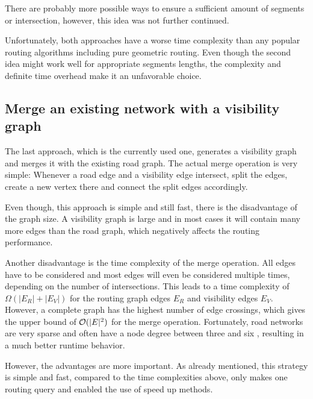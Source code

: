 		There are probably more possible ways to ensure a sufficient amount of segments or intersection, however, this idea was not further continued.
		
		Unfortunately, both approaches have a worse time complexity than any popular routing algorithms including pure geometric routing.
		Even though the second idea might work well for appropriate segments lengths, the complexity and definite time overhead make it an unfavorable choice.
	
	\subsection{Merge an existing network with a visibility graph}
	
		The last approach, which is the currently used one, generates a visibility graph and merges it with the existing road graph.
		The actual merge operation is very simple:
		Whenever a road edge and a visibility edge intersect, split the edges, create a new vertex there and connect the split edges accordingly.
		
		Even though, this approach is simple and still fast, there is the disadvantage of the graph size.
		A visibility graph is large and in most cases it will contain many more edges than the road graph, which negatively affects the routing performance.
		
		Another disadvantage is the time complexity of the merge operation.
		All edges have to be considered and most edges will even be considered multiple times, depending on the number of intersections.
		This leads to a time complexity of $\Omega(|E_R| + |E_V|)$ for the routing graph edges $E_R$ and visibility edges $E_V$.
		However, a complete graph has the highest number of edge crossings, which gives the upper bound of $\mathcal{O}(|E|^2)$ for the merge operation.
		Fortunately, road networks are very sparse and often have a node degree between three and six \cite{zhao-analysis-osm-bejing}\cite{boeing-osmnx}, resulting in a much better runtime behavior.
		
		However, the advantages are more important.
		As already mentioned, this strategy is simple and fast, compared to the time complexities above, only makes one routing query and enabled the use of speed up methods.
